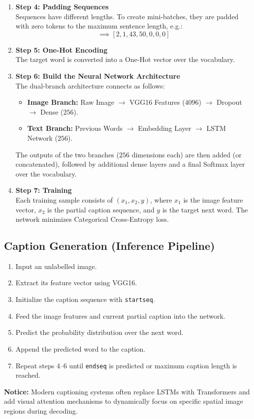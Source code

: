 \begin{enumerate}
    \item \textbf{Step 4: Padding Sequences} \\
    Sequences have different lengths. To create mini-batches, they are padded with zero tokens to the maximum sentence length, e.g.:
    \begin{equation}
    [\text{Hi}, \text{how}, \text{are}, \text{you}, \langle \text{Pad} \rangle, \langle \text{Pad} \rangle, \langle \text{Pad} \rangle] \implies [2, 1, 43, 50, 0, 0, 0]
    \end{equation}

    \item \textbf{Step 5: One-Hot Encoding} \\
    The target word is converted into a One-Hot vector over the vocabulary.

    \item \textbf{Step 6: Build the Neural Network Architecture} \\
    The dual-branch architecture connects as follows:
    \begin{itemize}
        \item \textbf{Image Branch:} Raw Image $\to$ VGG16 Features ($4096$) $\to$ Dropout $\to$ Dense ($256$).
        \item \textbf{Text Branch:} Previous Words $\to$ Embedding Layer $\to$ LSTM Network ($256$).
    \end{itemize}
    The outputs of the two branches ($256$ dimensions each) are then added (or concatenated), followed by additional dense layers and a final Softmax layer over the vocabulary.

    \item \textbf{Step 7: Training} \\
    Each training sample consists of $(x_1, x_2, y)$, where $x_1$ is the image feature vector, $x_2$ is the partial caption sequence, and $y$ is the target next word. The network minimizes Categorical Cross-Entropy loss.
\end{enumerate}

\subsection{Caption Generation (Inference Pipeline)}

\begin{enumerate}
    \item Input an unlabelled image.
    \item Extract its feature vector using VGG16.
    \item Initialize the caption sequence with \texttt{startseq}.
    \item Feed the image features and current partial caption into the network.
    \item Predict the probability distribution over the next word.
    \item Append the predicted word to the caption.
    \item Repeat steps 4--6 until \texttt{endseq} is predicted or maximum caption length is reached.
\end{enumerate}

\begin{propertybox}
\textbf{Notice:} Modern captioning systems often replace LSTMs with Transformers and add visual attention mechanisms to dynamically focus on specific spatial image regions during decoding.
\end{propertybox}
